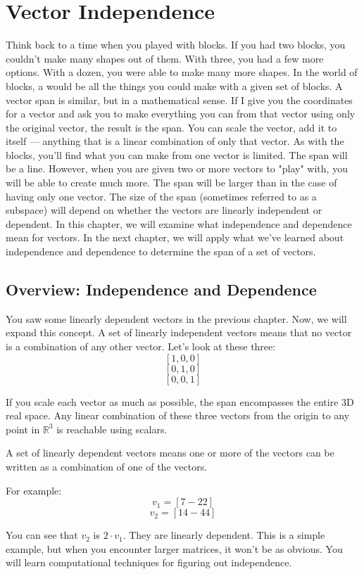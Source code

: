 \chapter{Vector Independence}
Think back to a time when you played with blocks. If you had two blocks, you 
couldn't make many shapes out of them. With three, you had a few more options. 
With a dozen, you were able to make many more shapes. In the world of blocks, 
a  would be all the things you could make with a given set of blocks. 
A vector span is similar, but in a mathematical sense. If I give you the 
coordinates for a vector and ask you to make everything you can from that 
vector using only the original vector, the result is the span. You can scale 
the vector, add it to itself --- anything that is a linear combination of only 
that vector. As with the blocks, you'll find what you can make from one vector 
is limited. The span will be a line. However, when you are given two or more 
vectors to "play" with, you will be able to create much more. The span will be 
larger than in the case of having only one vector. The size of the span 
(sometimes referred to as a subspace) will depend on whether the vectors are 
linearly independent or dependent. In this chapter, we will examine what 
independence and dependence mean for vectors. In the next chapter, we will 
apply what we've learned about independence and dependence to determine the 
span of a set of vectors. 

\section{Overview: Independence and Dependence}
You saw some linearly dependent vectors in the previous chapter. Now, we will 
expand this concept. A set of linearly independent vectors means that no 
vector is a combination of any other vector. Let's look at these three:
$$[1, 0, 0]$$
$$[0, 1, 0]$$
$$[0, 0, 1]$$

If you scale each vector as much as possible, the span encompasses the entire 
3D real space. Any linear combination of these three vectors from the origin to any point in $\mathbb{R}^3$ is reachable using scalars. 

A set of linearly dependent vectors means one or more of the vectors can be 
written as a combination of one of the vectors.

For example:
$$v_1 = [7 -2 2]$$
$$v_2 = [14 -4 4]$$

You can see that $v_2$ is $2\cdot v_1$. They are linearly dependent. This is a 
simple example, but when you encounter larger matrices, it won't be as obvious. 
You will learn computational techniques for figuring out independence.

